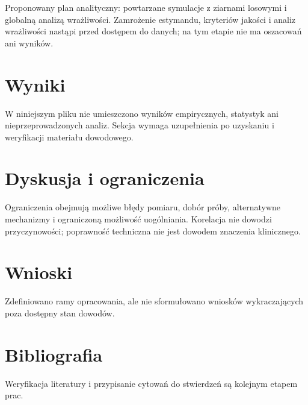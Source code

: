 \documentclass[11pt,a4paper]{article}
\begin{document}
Proponowany plan analityczny: powtarzane symulacje z ziarnami losowymi i globalną analizą wrażliwości. Zamrożenie estymandu, kryteriów jakości i analiz wrażliwości nastąpi przed dostępem do danych; na tym etapie nie ma oszacowań ani wyników.

\section{Wyniki}

W niniejszym pliku nie umieszczono wyników empirycznych, statystyk ani nieprzeprowadzonych analiz. Sekcja wymaga uzupełnienia po uzyskaniu i weryfikacji materiału dowodowego.

\section{Dyskusja i ograniczenia}

Ograniczenia obejmują możliwe błędy pomiaru, dobór próby, alternatywne mechanizmy i ograniczoną możliwość uogólniania. Korelacja nie dowodzi przyczynowości; poprawność techniczna nie jest dowodem znaczenia klinicznego.

\section{Wnioski}

Zdefiniowano ramy opracowania, ale nie sformułowano wniosków wykraczających poza dostępny stan dowodów.

\section*{Bibliografia}

Weryfikacja literatury i przypisanie cytowań do stwierdzeń są kolejnym etapem prac.
\end{document}

